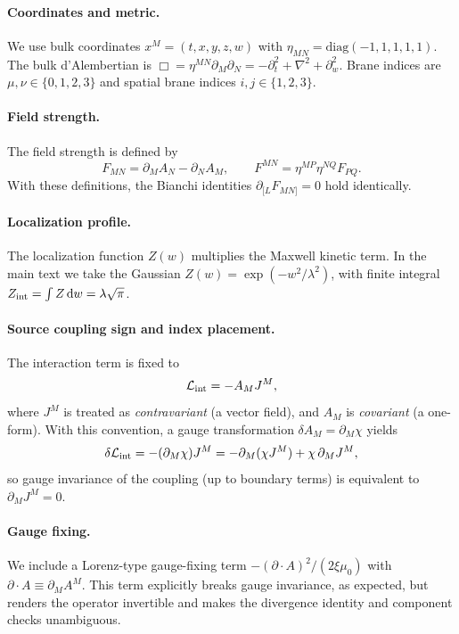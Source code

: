 \documentclass[11pt]{article}
\newcommand{\dd}{\mathrm d}
\newcommand{\A}{A}
\newcommand{\F}{F}
\newcommand{\J}{J}
\newcommand{\Z}{Z}
\newcommand{\lam}{\lambda}      %
\newcommand{\Zint}{Z_{\rm int}} %
\newcommand{\muo}{\mu_0}
\newcommand{\xigf}{\xi}
\begin{document}
\paragraph{Coordinates and metric.}
We use bulk coordinates \(x^M=(t,x,y,z,w)\) with
\(\eta_{MN}=\mathrm{diag}(-1,1,1,1,1)\). The bulk d'Alembertian is
\(\Box=\eta^{MN}\partial_M\partial_N=-\partial_t^2+\nabla^2+\partial_w^2\).
Brane indices are \(\mu,\nu\in\{0,1,2,3\}\) and spatial brane indices
\(i,j\in\{1,2,3\}\).

\paragraph{Field strength.}
The field strength is defined by
\begin{equation}
  \F_{MN}=\partial_M\A_N-\partial_N\A_M,
  \qquad
  \F^{MN}=\eta^{MP}\eta^{NQ}\F_{PQ}.
\end{equation}
With these definitions, the Bianchi identities
\(\partial_{[L}\F_{MN]}=0\) hold identically.

\paragraph{Localization profile.}
The localization function \(\Z(w)\) multiplies the Maxwell kinetic term. In the
main text we take the Gaussian
\(\Z(w)=\exp(-w^2/\lam^2)\), with finite integral
\(\Zint=\int\Z\,\dd w=\lam\sqrt{\pi}\).

\paragraph{Source coupling sign and index placement.}
The interaction term is fixed to
\begin{equation}
  \mathcal L_{\rm int} = -\A_M \J^M,
\end{equation}
where \(\J^M\) is treated as \emph{contravariant} (a vector field), and \(\A_M\)
is \emph{covariant} (a one-form). With this convention, a gauge transformation
\(\delta \A_M=\partial_M\chi\) yields
\begin{equation}
  \delta \mathcal L_{\rm int}
  = -(\partial_M\chi)\J^M
  = -\partial_M(\chi\J^M)+\chi\,\partial_M\J^M,
\end{equation}
so gauge invariance of the coupling (up to boundary terms) is equivalent to
\(\partial_M\J^M=0\).

\paragraph{Gauge fixing.}
We include a Lorenz-type gauge-fixing term
\(-(\partial\!\cdot\!\A)^2/(2\xigf\muo)\) with
\(\partial\!\cdot\!\A\equiv\partial_M\A^M\). This term explicitly breaks gauge
invariance, as expected, but renders the operator invertible and makes the
divergence identity and component checks unambiguous.
\end{document}
